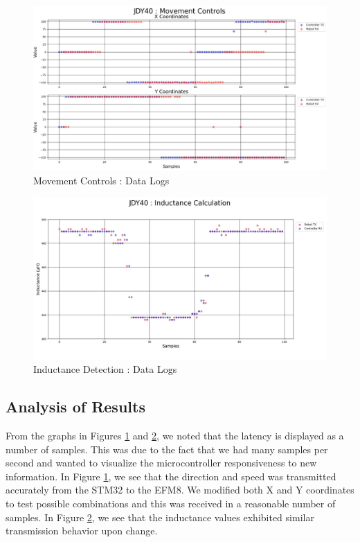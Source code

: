 \documentclass{article}
\begin{document}
\begin{figure}[htbp]
    \centering
    \includegraphics[width=1\textwidth]{Figures/Movement_Logs.jpg}
    \caption{Movement Controls : Data Logs}
    \label{fig:movement_controls_logs}
\end{figure}

\begin{figure}[htbp]
    \centering
    \includegraphics[width=1\textwidth]{Figures/Inductance_Logs.jpg}
    \caption{Inductance Detection : Data Logs}
    \label{fig:inductance_detection_logs}
\end{figure}

\subsection{Analysis of Results}

From the graphs in Figures \ref{fig:movement_controls_logs} and \ref{fig:inductance_detection_logs}, we noted that the latency is displayed as a number of samples. This was due to the fact that we had
many samples per second and wanted to visualize the microcontroller responsiveness to new information. In Figure \ref{fig:movement_controls_logs}, we
see that the direction and speed was transmitted accurately from the STM32 to the EFM8. We modified both X and Y coordinates to test possible combinations and this was received in a reasonable number of samples.
In Figure \ref{fig:inductance_detection_logs}, we see that the inductance values exhibited similar transmission behavior upon change.
\end{document}
